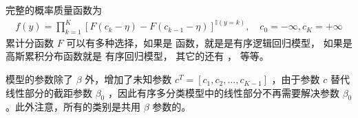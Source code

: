 \documentclass[letterpaper,10pt,english]{sphinxmanual}
\begin{document}
完整的概率质量函数为
\begin{equation}\label{equation:有序离散模型/content:eq_ordered_logistic_011}
\begin{split}f(y) = \prod_{k=1}^K \left [ F(c_k - \eta) - F(c_{k-1} - \eta) \right ] ^{ \mathbb{I}(y=k)}
,\quad c_0=-\infty,c_{K}=+\infty\end{split}
\end{equation}
累计分函数 \(F\) 可以有多种选择，如果是  函数，就是是有序逻辑回归模型，
如果是高斯累积分布函数就是  有序回归模型，
其它的还有  ， 等等。

模型的参数除了 \(\beta\) 外，增加了未知参数 \(c^T=[c_1,c_2,\dots,c_{K-1}]\)
，由于参数 \(c\) 替代线性部分的截距参数 \(\beta_0\)
，因此有序多分类模型中的线性部分不再需要解决参数 \(\beta_0\)
。此外注意，所有的类别是共用 \(\beta\) 参数的。
\end{document}
